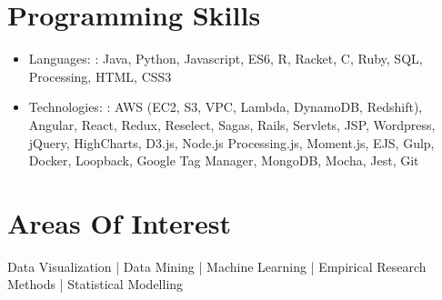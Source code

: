 \documentclass[letterpaper,11pt]{article}
\newcommand{\resumeItem}[2]{
  \item\small{
    {#1}{: #2 \vspace{-2pt}}
  }
}
\newcommand{\resumeSubItem}[2]{\resumeItem{#1}{#2}\vspace{-4pt}}
\newcommand{\resumeSubHeadingListStart}{\begin{itemize}[leftmargin=*]}
\newcommand{\resumeSubHeadingListEnd}{\end{itemize}}
\begin{document}
%
\section{Programming Skills}
\resumeSubHeadingListStart
   
\resumeSubItem{Languages}{: Java, Python, Javascript, ES6, R, Racket, C, Ruby, SQL, Processing, HTML, CSS3}
\hfill
    
\resumeSubItem{Technologies}{: AWS (EC2, S3, VPC, Lambda, DynamoDB, Redshift), Angular, React, Redux, Reselect, Sagas, Rails, Servlets, JSP, Wordpress, jQuery, HighCharts, D3.js, Node.js Processing.js, Moment.js, EJS, Gulp, Docker, Loopback, Google Tag Manager, MongoDB, Mocha, Jest, Git}
    
\resumeSubHeadingListEnd

%
\section{Areas Of Interest}
{Data Visualization | Data Mining | Machine Learning | Empirical Research Methods | Statistical Modelling}

\end{document}
